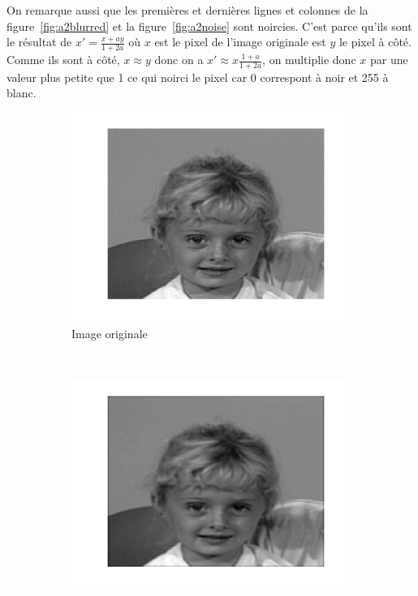 On remarque aussi que les premières et dernières lignes et colonnes de la figure~\ref{fig:a2blurred} et la figure~\ref{fig:a2noise}
sont noircies.
C'est parce qu'ils sont le résultat de $x' = \frac{x + ay}{1 + 2a}$ où $x$ est le pixel de l'image originale est $y$ le pixel à côté.
Comme ils sont à côté, $x \approx y$ donc on a $x' \approx x \frac{1+a}{1+2a}$, on multiplie donc $x$ par une valeur plus petite que 1 ce qui noirci le pixel
car $0$ correspont à noir et 255 à blanc.
\begin{figure}
  \centering
  \begin{subfigure}[b]{0.45\textwidth}
    \includegraphics[width=\textwidth]{Q2/original_20.png}
    \caption{Image originale}
    \label{fig:a2original}
  \end{subfigure}%
  ~ %
  \begin{subfigure}[b]{0.45\textwidth}
    \includegraphics[width=\textwidth]{Q2/blurred_20.png}

\end{subfigure}
\end{figure}
